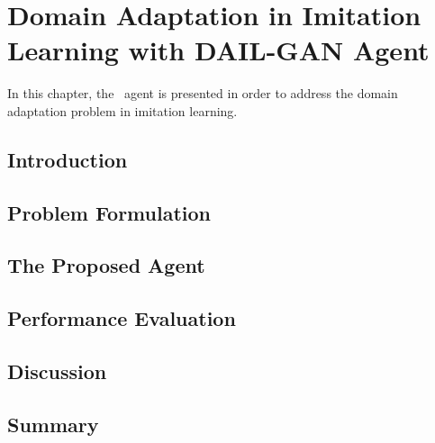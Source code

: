 \chapter{Domain Adaptation in Imitation Learning with DAIL-GAN Agent\label{ch:DAIL}}


\renewcommand{\SectionsDir}{Chapter3/Sections}
\renewcommand{\SubsectionsDir}{Chapter3/Sections/Subsections}
\renewcommand{\FigsDir}{Chapter3/Figs}
\renewcommand{\TablesDir}{Chapter3/Tables}


In this chapter, the \DAIL\ agent is presented in order to address the domain adaptation problem in imitation learning.


\section{Introduction\label{ch:DAIL:sec:Introduction}}


\section{Problem Formulation\label{ch:DAIL:sec:ProblemFormulation}}


\section{The Proposed \DAIL{} Agent\label{ch:DAIL:sec:Proposal}}


\section{Performance Evaluation\label{ch:DAIL:sec:Evaluation}}


\section{Discussion\label{ch:DAIL:sec:Discussion}}


\section{Summary}

